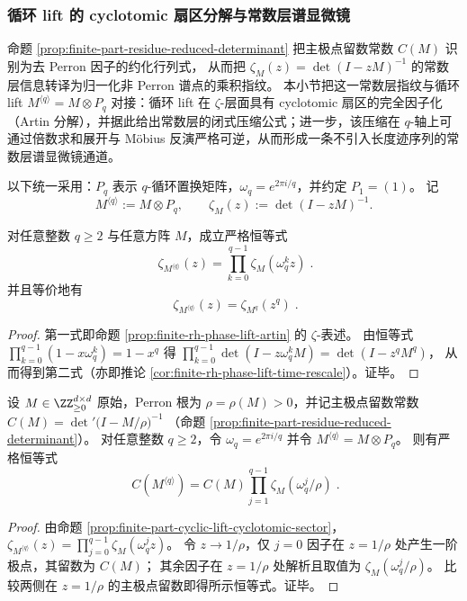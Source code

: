 \subsubsection{循环 lift 的 cyclotomic 扇区分解与常数层谱显微镜}\label{subsec:finite-part-cyclic-lift-cyclotomic-microscope}
命题 \ref{prop:finite-part-residue-reduced-determinant} 把主极点留数常数 \(C(M)\) 识别为去 Perron 因子的约化行列式，
从而把 \(\zeta_M(z)=\det(I-zM)^{-1}\) 的常数层信息转译为归一化非 Perron 谱点的乘积指纹。
本小节把这一常数层指纹与循环 lift \(M^{\langle q\rangle}=M\otimes P_q\) 对接：循环 lift 在 \(\zeta\)-层面具有 cyclotomic 扇区的完全因子化（Artin 分解），并据此给出常数层的闭式压缩公式；进一步，该压缩在 \(q\)-轴上可通过倍数求和展开与 Möbius 反演严格可逆，从而形成一条不引入长度迹序列的常数层谱显微镜通道。
\par
以下统一采用：\(P_q\) 表示 \(q\)-循环置换矩阵，\(\omega_q=e^{2\pi i/q}\)，并约定 \(P_1=(1)\)。
记
\[
M^{\langle q\rangle}:=M\otimes P_q,\qquad
\zeta_M(z):=\det(I-zM)^{-1}.
\]

\begin{proposition}\label{prop:finite-part-cyclic-lift-cyclotomic-sector}
对任意整数 \(q\ge 2\) 与任意方阵 \(M\)，成立严格恒等式
\[
\boxed{\;
\zeta_{M^{\langle q\rangle}}(z)=\prod_{k=0}^{q-1}\zeta_M(\omega_q^{k}z)\; }.
\]
并且等价地有
\[
\boxed{\;
\zeta_{M^{\langle q\rangle}}(z)=\zeta_{M^{q}}(z^{q})\; }.
\]
\end{proposition}
\begin{proof}
第一式即命题 \ref{prop:finite-rh-phase-lift-artin} 的 \(\zeta\)-表述。
由恒等式 \(\prod_{k=0}^{q-1}(1-x\omega_q^k)=1-x^q\) 得
\(
\prod_{k=0}^{q-1}\det(I-z\omega_q^kM)=\det(I-z^qM^q)
\)，
从而得到第二式（亦即推论 \ref{cor:finite-rh-phase-lift-time-rescale}）。证毕。
\end{proof}

\begin{proposition}\label{prop:finite-part-cyclic-lift-torsion-product}
设 \(M\in\ZZ_{\ge 0}^{d\times d}\) 原始，Perron 根为 \(\rho=\rho(M)>0\)，并记主极点留数常数
\(
C(M)=\det\nolimits'\!\bigl(I-M/\rho\bigr)^{-1}
\)
（命题 \ref{prop:finite-part-residue-reduced-determinant}）。
对任意整数 \(q\ge 2\)，令 \(\omega_q=e^{2\pi i/q}\) 并令 \(M^{\langle q\rangle}=M\otimes P_q\)。
则有严格恒等式
\[
\boxed{\;
C(M^{\langle q\rangle})
=C(M)\prod_{j=1}^{q-1}\zeta_M(\omega_q^j/\rho)\; }.
\]
\end{proposition}
\begin{proof}
由命题 \ref{prop:finite-part-cyclic-lift-cyclotomic-sector}，
\(
\zeta_{M^{\langle q\rangle}}(z)=\prod_{j=0}^{q-1}\zeta_M(\omega_q^j z)
\)。
令 \(z\to 1/\rho\)，仅 \(j=0\) 因子在 \(z=1/\rho\) 处产生一阶极点，其留数为 \(C(M)\)；
其余因子在 \(z=1/\rho\) 处解析且取值为 \(\zeta_M(\omega_q^j/\rho)\)。
比较两侧在 \(z=1/\rho\) 的主极点留数即得所示恒等式。证毕。
\end{proof}

